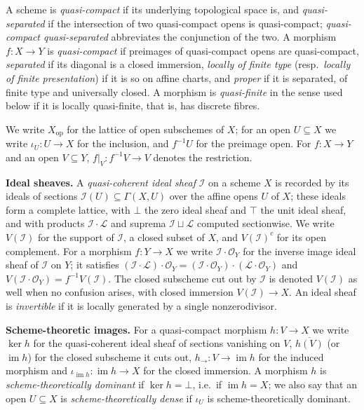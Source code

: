 \documentclass[11pt,a4paper]{article}
\theoremstyle{plain}
\theoremstyle{definition}
\theoremstyle{remark}
\newcommand{\sO}{\mathcal{O}}
\newcommand{\sI}{\mathcal{I}}
\newcommand{\sL}{\mathcal{L}}
\newcommand{\im}{\operatorname{im}}
\newcommand{\qcqs}{quasi-compact quasi-separated}
\begin{document}
A scheme is \emph{quasi-compact} if its underlying topological space is, and
\emph{quasi-separated} if the intersection of two quasi-compact opens is
quasi-compact; \emph{\qcqs{}} abbreviates the conjunction of the two. A
morphism $f\colon X\to Y$ is \emph{quasi-compact} if preimages of quasi-compact
opens are quasi-compact, \emph{separated} if its diagonal is a closed
immersion, \emph{locally of finite type} (resp.\ \emph{locally of finite
presentation}) if it is so on affine charts, and \emph{proper} if it is
separated, of finite type and universally closed. A morphism is
\emph{quasi-finite} in the sense used below if it is locally quasi-finite, that
is, has discrete fibres.

We write $X_{\mathrm{op}}$ for the lattice of open subschemes of $X$; for an
open $U\subseteq X$ we write $\iota_U\colon U\to X$ for the inclusion, and
$f^{-1}U$ for the preimage open. For $f\colon X\to Y$ and an open $V\subseteq
Y$, $f|_V\colon f^{-1}V\to V$ denotes the restriction.

\medskip\noindent\textbf{Ideal sheaves.}
A \emph{quasi-coherent ideal sheaf} $\sI$ on a scheme $X$ is recorded by its
ideals of sections $\sI(U)\subseteq\Gamma(X,U)$ over the affine opens $U$ of
$X$; these ideals form a complete lattice, with $\bot$ the zero ideal sheaf and
$\top$ the unit ideal sheaf, and with products $\sI\cdot\sL$ and suprema
$\sI\sqcup\sL$ computed sectionwise. We write $V(\sI)$ for the support of
$\sI$, a closed subset of $X$, and $V(\sI)^{c}$ for its open complement. For a
morphism $f\colon Y\to X$ we write $\sI\cdot\sO_Y$ for the inverse image ideal
sheaf of $\sI$ on $Y$; it satisfies
$(\sI\cdot\sL)\cdot\sO_Y=(\sI\cdot\sO_Y)\cdot(\sL\cdot\sO_Y)$ and
$V(\sI\cdot\sO_Y)=f^{-1}V(\sI)$. The closed subscheme cut out by $\sI$ is
denoted $V(\sI)$ as well when no confusion arises, with closed immersion
$V(\sI)\to X$. An ideal sheaf is \emph{invertible} if it is locally generated
by a single nonzerodivisor.

\medskip\noindent\textbf{Scheme-theoretic images.}
For a quasi-compact morphism $h\colon V\to X$ we write $\ker h$ for the
quasi-coherent ideal sheaf of sections vanishing on $V$, $\overline{h(V)}$ (or
$\im h$) for the closed subscheme it cuts out, $h_{\to}\colon V\to \im h$ for
the induced morphism and $\iota_{\im h}\colon \im h\to X$ for the closed
immersion. A morphism $h$ is \emph{scheme-theoretically dominant} if $\ker
h=\bot$, i.e.\ if $\im h=X$; we also say that an open $U\subseteq X$ is
\emph{scheme-theoretically dense} if $\iota_U$ is scheme-theoretically
dominant.
\end{document}
